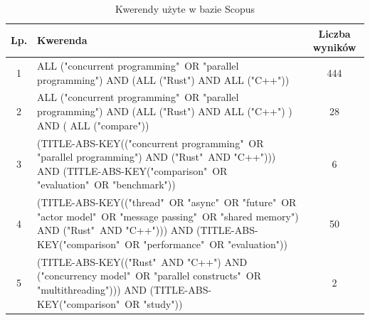 \begin{table}[H]
    \caption{Kwerendy użyte w bazie Scopus \protect \footnotemark}
    \label{table:literatureReviewQueries}
    \begin{tabular}{cp{11cm}c}
    \hline
    Lp. & Kwerenda & Liczba wyników \\ \hline
    1 & ALL ("concurrent programming"\ OR "parallel programming") AND (ALL ("Rust") AND ALL ("C++")) & 444 \\ \hline

    2 & ALL ("concurrent programming"\ OR "parallel programming") AND (ALL ("Rust") AND ALL ("C++") ) AND ( ALL ("compare")) & 28 \\ \hline

    3 & (TITLE-ABS-KEY(("concurrent programming"\ OR "parallel programming") AND ("Rust"\ AND "C++"))) AND (TITLE-ABS-KEY("comparison"\ OR "evaluation"\ OR "benchmark")) & 6 \\ \hline

    4 & (TITLE-ABS-KEY(("thread"\ OR "async"\ OR "future"\ OR "actor model"\ OR "message passing"\ OR "shared memory") AND ("Rust"\ AND "C++"))) AND (TITLE-ABS-KEY("comparison"\ OR "performance"\ OR "evaluation")) & 50 \\ \hline

    5 & (TITLE-ABS-KEY(("Rust"\ AND "C++") AND ("concurrency model"\ OR "parallel constructs"\ OR "multithreading"))) AND (TITLE-ABS-KEY("comparison"\ OR "study")) & 2 \\ \hline

    \end{tabular}
\end{table}

